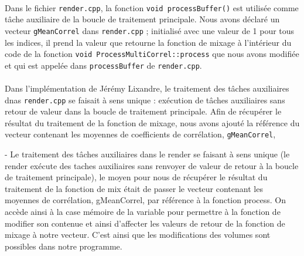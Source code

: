 
 \paragraph{}
 Dans le fichier \verb!render.cpp!, la fonction
 \verb!void processBuffer()! est utilisée comme tâche auxiliaire de la
 boucle de traitement principale. Nous avons déclaré un vecteur
 \verb!gMeanCorrel! dans \verb!render.cpp! ; initialisé avec une valeur
 de 1 pour tous les indices, il prend la valeur que retourne la
 fonction de mixage à l'intérieur du code de la fonction
 \verb!void ProcessMultiCorrel::process!
 que nous avons modifiée et qui est appelée dans \verb!processBuffer!
 de \verb!render.cpp!.
 \paragraph{}
 Dans l'implémentation de Jérémy Lixandre, le traitement des tâches auxiliaires dnas \verb!render.cpp! se faisait à sens unique : exécution de tâches auxiliaires sans retour de valeur dans la boucle de traitement principale. Afin de récupérer le résultat du traitement de la fonction de mixage, nous avons ajouté la référence du vecteur contenant les moyennes de coefficients de corrélation, \verb!gMeanCorrel!, %

 - Le traitement des tâches auxiliaires dans le render se faisant à sens
 unique (le render exécute des taches auxiliaires sans renvoyer de valeur de
 retour à la boucle de traitement principale), le moyen pour nous de récupérer
 le résultat du traitement de la fonction de mix était de passer le vecteur
 contenant les moyennes de corrélation, gMeanCorrel, par référence à la
 fonction process. On accède ainsi à la case mémoire de la variable pour
 permettre à la fonction de modifier son contenue et ainsi d'affecter les
 valeurs de retour de la fonction de mixage à notre vecteur. C'est ainsi que
 les modifications des volumes sont possibles dans notre programme.

